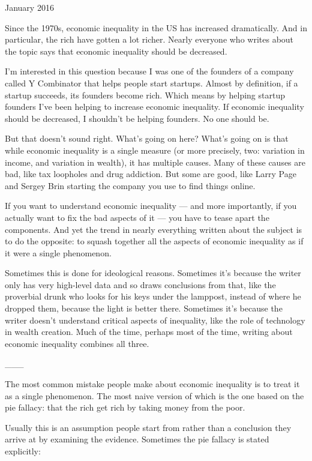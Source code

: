 January 2016

Since the 1970s, economic inequality in the US has increased
dramatically. And in particular, the rich have gotten a lot richer.
Nearly everyone who writes about the topic says that economic inequality
should be decreased.

I'm interested in this question because I was one of the founders of a
company called Y Combinator that helps people start startups. Almost by
definition, if a startup succeeds, its founders become rich. Which means
by helping startup founders I've been helping to increase economic
inequality. If economic inequality should be decreased, I shouldn't be
helping founders. No one should be.

But that doesn't sound right. What's going on here? What's going on is
that while economic inequality is a single measure (or more precisely,
two: variation in income, and variation in wealth), it has multiple
causes. Many of these causes are bad, like tax loopholes and drug
addiction. But some are good, like Larry Page and Sergey Brin starting
the company you use to find things online.

If you want to understand economic inequality --- and more importantly,
if you actually want to fix the bad aspects of it --- you have to tease
apart the components. And yet the trend in nearly everything written
about the subject is to do the opposite: to squash together all the
aspects of economic inequality as if it were a single phenomenon.

Sometimes this is done for ideological reasons. Sometimes it's because
the writer only has very high-level data and so draws conclusions from
that, like the proverbial drunk who looks for his keys under the
lamppost, instead of where he dropped them, because the light is better
there. Sometimes it's because the writer doesn't understand critical
aspects of inequality, like the role of technology in wealth creation.
Much of the time, perhaps most of the time, writing about economic
inequality combines all three.

\_\_\_

The most common mistake people make about economic inequality is to
treat it as a single phenomenon. The most naive version of which is the
one based on the pie fallacy: that the rich get rich by taking money
from the poor.

Usually this is an assumption people start from rather than a conclusion
they arrive at by examining the evidence. Sometimes the pie fallacy is
stated explicitly:

